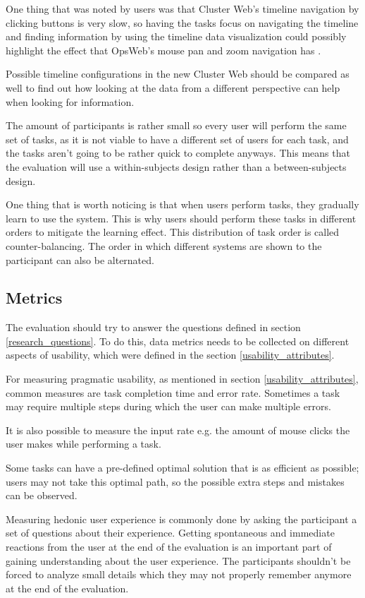 One thing that was noted by users was that Cluster Web's timeline navigation by clicking buttons is very slow, so having the tasks focus on navigating the timeline and finding information by using the timeline data visualization could possibly highlight the effect that OpsWeb's mouse pan and zoom navigation has .

Possible timeline configurations in the new Cluster Web should be compared as well to find out how looking at the data from a different perspective can help when looking for information.

The amount of participants is rather small so every user will perform the same set of tasks, as it is not viable to have a different set of users for each task, and the tasks aren't going to be rather quick to complete anyways. This means that the evaluation will use a within-subjects design rather than a between-subjects design. 

One thing that is worth noticing is that when users perform tasks, they gradually learn to use the system. This is why users should perform these tasks in different orders to mitigate the learning effect. This distribution of task order is called counter-balancing. The order in which different systems are shown to the participant can also be alternated.
\cite{rubin2008handbook}

\subsection{Metrics}
The evaluation should try to answer the questions defined in section \ref{research_questions}. To do this, data metrics needs to be collected on different aspects of usability, which were defined in the section \ref{usability_attributes}.

For measuring pragmatic usability, as mentioned in section \ref{usability_attributes}, common measures are task completion time and error rate. Sometimes a task may require multiple steps during which the user can make multiple errors. 

It is also possible to measure the input rate e.g. the amount of mouse clicks the user makes while performing a task.

Some tasks can have a pre-defined optimal solution that is as efficient as possible; users may not take this optimal path, so the possible extra steps and mistakes can be observed. \cite{hornbaek2006current}

Measuring hedonic user experience is commonly done by asking the participant a set of questions about their experience. Getting spontaneous and immediate reactions from the user at the end of the evaluation is an important part of gaining understanding about the user experience. The participants shouldn't be forced to analyze small details which they may not properly remember anymore at the end of the evaluation. \cite{laugwitz2008construction}

